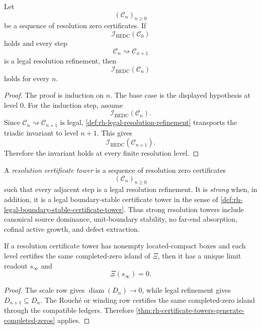 \begin{theorem}
\label{thm:rh-resolution-induction}
Let
$$
(\mathcal C_n)_{n\ge0}
$$
be a sequence of resolution zero certificates. If
$$
\mathcal I_{\mathrm{BEDC}}(\mathcal C_0)
$$
holds and every step
$$
\mathcal C_n\rightsquigarrow\mathcal C_{n+1}
$$
is a legal resolution refinement, then
$$
\mathcal I_{\mathrm{BEDC}}(\mathcal C_n)
$$
holds for every $n$.
\end{theorem}

\begin{proof}
The proof is induction on $n$. The base case is the displayed
hypothesis at level $0$. For the induction step, assume
$$
\mathcal I_{\mathrm{BEDC}}(\mathcal C_n).
$$
Since $\mathcal C_n\rightsquigarrow\mathcal C_{n+1}$ is legal,
\autoref{def:rh-legal-resolution-refinement} transports the triadic
invariant to level $n+1$. This gives
$$
\mathcal I_{\mathrm{BEDC}}(\mathcal C_{n+1}).
$$
Therefore the invariant holds at every finite resolution level.
\end{proof}

\begin{definition}
\label{def:rh-resolution-certificate-tower}
A \emph{resolution certificate tower} is a sequence of resolution zero
certificates
$$
(\mathcal C_n)_{n\ge0}
$$
such that every adjacent step is a legal resolution refinement. It is
\emph{strong} when, in addition, it is a legal boundary-stable
certificate tower in the sense of
\autoref{def:rh-legal-boundary-stable-certificate-tower}. Thus strong
resolution towers include canonical source dominance, unit-boundary
stability, no far-end absorption, cofinal active growth, and defect
extraction.
\end{definition}

\begin{theorem}
\label{thm:rh-resolution-towers-exact-completed-zero-limits}
If a resolution certificate tower has nonempty located-compact boxes and
each level certifies the same completed-zero island of $\Xi$, then it
has a unique limit readout $s_{\infty}$ and
$$
\Xi(s_{\infty})=0.
$$
\end{theorem}

\begin{proof}
The scale row gives $\operatorname{diam}(D_n)\to0$, while legal
refinement gives $D_{n+1}\subseteq D_n$. The Rouch\'e or winding row
certifies the same completed-zero island through the compatible ledgers.
Therefore \autoref{thm:rh-certificate-towers-generate-completed-zeros}
applies.
\end{proof}

